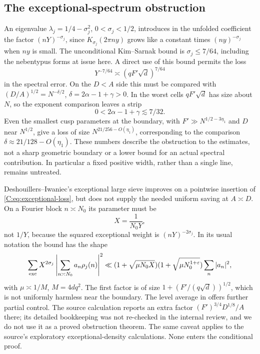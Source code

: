 \subsection{The exceptional-spectrum obstruction}
An eigenvalue $\lambda_j=1/4-\sigma_j^2$, $0<\sigma_j<1/2$, introduces
in the unfolded coefficient the factor $(nY)^{-\sigma_j}$, since
$K_{\sigma_j}(2\pi ny)$ grows like a constant times $(ny)^{-\sigma_j}$
when $ny$ is small.  The unconditional Kim--Sarnak bound
\cite[Appendix~2]{KS} is $\sigma_j\leq7/64$, including the
nebentypus forms at issue here.  A direct use of this bound permits the
loss
\begin{equation}\label{C:eq:exceptional-loss}
 Y^{-7/64}\asymp(qF'\sqrt d)^{7/64}
\end{equation}
in the spectral error.  On the $D<A$ side this must be compared with
$(D/A)^{1/2}=N^{-\delta/2}$, $\delta=2\alpha-1+\gamma>0$.
In the worst cells $qF'\sqrt d$ has size about $N$, so the exponent
comparison leaves a strip
\[
 0<2\alpha-1+\gamma\lesssim7/32.
\]
Even the smallest cusp parameters at the boundary, with
$F'\gg N^{1/2-3\eta_1}$ and $D$ near $N^{1/2}$, give a loss of
size $N^{21/256-O(\eta_1)}$, corresponding to the comparison
$\delta\approx21/128-O(\eta_1)$.  These numbers describe the
obstruction to the estimates, not a sharp geometric boundary or a
lower bound for an actual spectral contribution.  In particular a
fixed positive width, rather than a single line, remains untreated.

\begin{assessment}\label{C:ass:exceptional}
Deshouillers--Iwaniec's exceptional large sieve
\cite[Theorem~5]{DI} improves on a pointwise insertion of
\eqref{C:eq:exceptional-loss}, but does not supply the needed uniform
saving at $A\asymp D$.  On a Fourier block $n\asymp N_0$ its parameter
must be
\[
 X=\frac1{N_0Y},
\]
not $1/Y$, because the squared exceptional weight is
$(nY)^{-2\sigma_j}$.  In its usual notation the bound has the shape
\[
 \sum_{\rm exc}X^{2\sigma_j}
 \left|\sum_{n\asymp N_0}a_n\rho_j(n)\right|^2
 \ll (1+\sqrt{\mu N_0X})(1+\sqrt{\mu N_0^{1+\varepsilon}})
 \sum_n|a_n|^2,
\]
with $\mu\asymp1/M$, $M=4dq^2$.  The first factor is of size
$1+(F'/(q\sqrt d))^{1/2}$, which is not uniformly harmless near the
boundary.  The level average in \cite[Theorem~6]{DI} offers further
partial control.  The source calculation reports an extra factor
$(F')^{3/4}D^{1/8}/A$ there; its detailed bookkeeping was not re-checked
in the internal review, and we do not use it as a proved obstruction
theorem.  The same caveat applies to the source's exploratory
exceptional-density calculations.  None enters the conditional proof.
\end{assessment}

